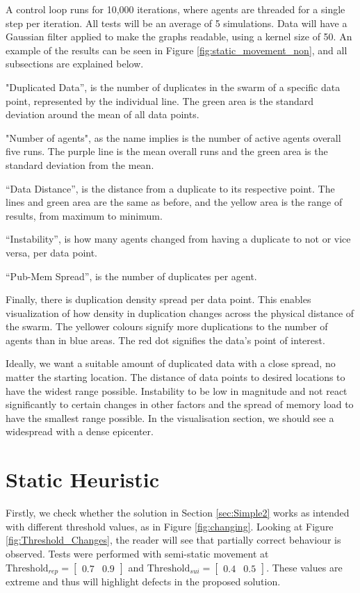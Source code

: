 \documentclass{UoYCSproject}
\begin{document}
A control loop runs for 10,000 iterations, where agents are threaded for a single step per iteration.
All tests will be an average of 5 simulations.
Data will have a Gaussian filter applied to make the graphs readable, using a kernel size of 50.
An example of the results can be seen in Figure \ref{fig:static_movement_non}, and all subsections are explained below.

"Duplicated Data”, is the number of duplicates in the swarm of a specific data point, represented by the individual line.
The green area is the standard deviation around the mean of all data points.

"Number of agents", as the name implies is the number of active agents overall five runs.
The purple line is the mean overall runs and the green area is the standard deviation from the mean.

“Data Distance”, is the distance from a duplicate to its respective point.
The lines and green area are the same as before, and the yellow area is the range of results, from maximum to minimum.

“Instability”, is how many agents changed from having a duplicate to not or vice versa, per data point.

“Pub-Mem Spread”, is the number of duplicates per agent.

Finally, there is duplication density spread per data point.
This enables visualization of how density in duplication changes across the physical distance of the swarm.
The yellower colours signify more duplications to the number of agents than in blue areas.
The red dot signifies the data’s point of interest.

Ideally, we want a suitable amount of duplicated data with a close spread, no matter the starting location.
The distance of data points to desired locations to have the widest range possible.
Instability to be low in magnitude and not react significantly to certain changes in other factors and the spread of memory load to have the smallest range possible.
In the visualisation section, we should see a widespread with a dense epicenter.


\section{Static Heuristic}
\label{sec:Simple2a}

Firstly, we check whether the solution in Section \ref{sec:Simple2} works as intended with different threshold values, as in Figure \ref{fig:changing}.
Looking at Figure \ref{fig:Threshold_Changes}, the reader will see that partially correct behaviour is observed.
Tests were performed with semi-static movement at $\text{Threshold}_{rep} = \begin{bmatrix} 0.7 & 0.9 \end{bmatrix}$ and $\text{Threshold}_{sui} = \begin{bmatrix} 0.4 & 0.5 \end{bmatrix}$.
These values are extreme and thus will highlight defects in the proposed solution.
\end{document}
